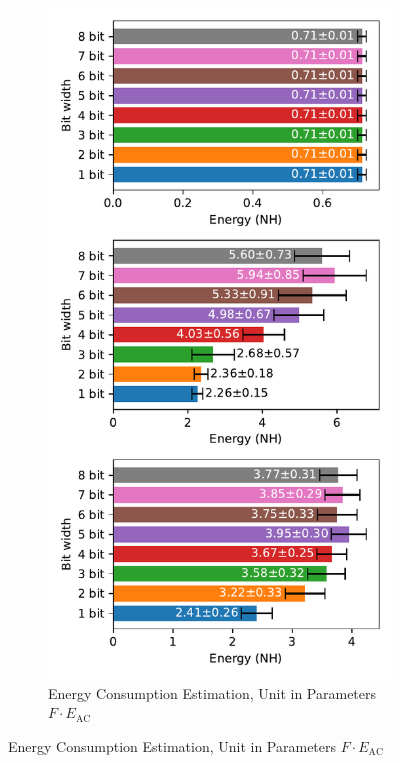         \begin{figure}[H]
            \centering
            \begin{subfigure}[H]{0.7\textwidth}
                \centering
                \includegraphics[width=\textwidth]{../standard/NMNIST/plots/nmnist_test_energy_nh.pdf}
                \caption{Energy Consumption Estimation, Unit in Parameters $F\cdot E_{\text{AC}}$}
            \end{subfigure}
        \end{figure}
